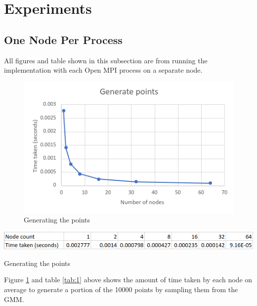 \documentclass{article}
\begin{document}
\clearpage
\section*{Experiments}
\subsection*{One Node Per Process}
All figures and table shown in this subsection are from running the implementation with each Open
MPI process on a separate node.

\begin{figure}[!htb]
\includegraphics[width=\textwidth]{generate-points.png}
\caption{Generating the points}
\label{fig:1}
\end{figure}
\begin{table}[!htb]
\includegraphics[width=\textwidth]{generate-points-table.png}
\caption{Generating the points}
\label{tab:1}
\end{table}

Figure \ref{fig:1} and table \ref{tab:1} above shows the amount of time taken by each node on
average to generate a portion of the 10000 points by sampling them from the GMM.
\end{document}
